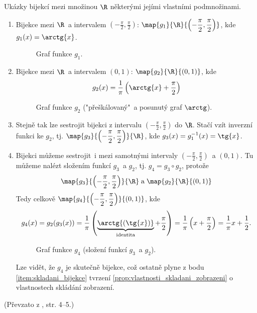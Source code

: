 \begin{example}\label{ex:bijekce_realna_cisla}
    Ukázky bijekcí mezi množinou $\R$ některými jejími vlastními podmnožinami.
    \begin{enumerate}[label=(\roman*)]
        \item\label{item:funkce_arctg} Bijekce mezi $\R$~a intervalem $\displaystyle\left(-\frac{\pi}{2},\frac{\pi}{2}\right)$: $\displaystyle\map{g_1}{\R}{\left(-\frac{\pi}{2},\frac{\pi}{2}\right)}$, kde $g_1(x)=\arctg{x}$.
        \begin{figure}[H]
            \centering
            
            \caption{Graf funkce $g_1$.}
            \label{fig:graf_g1}
        \end{figure}
        \item\label{item:bijekce_0_a_1} Bijekce mezi $\R$~a intervalem $(0,1)$: $\map{g_2}{\R}{(0,1)}$, kde
        \begin{equation*}
            g_2(x)=\frac{1}{\pi}\left(\arctg{x}+\frac{\pi}{2}\right)
        \end{equation*}
        \begin{figure}[H]
            \centering
            
            \caption{Graf funkce $g_2$ ("přeškálovaný"~a posunutý graf $\arctg$).}
            \label{fig:graf_g2}
        \end{figure}
        \item\label{item:funkce_tg} Stejně tak lze sestrojit bijekci z intervalu $\displaystyle\left(-\frac{\pi}{2},\frac{\pi}{2}\right)$ do $\R$. Stačí vzít inverzní funkci ke $g_2$, tj. $\displaystyle\map{g_3}{\left(-\frac{\pi}{2},\frac{\pi}{2}\right)}{\R}$, kde $g_3(x)=g_1^{-1}(x)=\tg{x}$.
        \item\label{item:bijekce_slozena} Bijekci můžeme sestrojit~i mezi samotnými intervaly $\displaystyle\left(-\frac{\pi}{2},\frac{\pi}{2}\right)$~a $(0,1)$. Tu můžeme nalézt složením funkcí $g_3$~a $g_2$, tj. $g_4=g_3\circ g_2$, protože
        \begin{equation*}
            \map{g_3}{\left(-\frac{\pi}{2},\frac{\pi}{2}\right)}{\R}\;\text{a}\;\map{g_2}{\R}{(0,1)}
        \end{equation*}
        Tedy celkově $\displaystyle\map{g_4}{\left(-\frac{\pi}{2},\frac{\pi}{2}\right)}{(0,1)}$, kde
        \begin{equation*}
            g_4(x)=g_2(g_3(x))=\frac{1}{\pi}\left(\underbrace{\arctg{(\tg{x})}}_{\text{identita}}+\frac{\pi}{2}\right)=\frac{1}{\pi}\left(x+\frac{\pi}{2}\right)=\frac{1}{\pi}x+\frac{1}{2}.
        \end{equation*}
        \begin{figure}[H]
            \centering
            
            \caption{Graf funkce $g_4$ (složení funkcí $g_3$~a $g_2$).}
            \label{fig:graf_g4}
        \end{figure}
        Lze vidět, že $g_4$ je skutečně bijekce, což ostatně plyne z bodu \ref{item:skladani_bijekce} tvrzení \ref{prop:vlastnosti_skladani_zobrazeni} o vlastnostech skládání zobrazení.
    \end{enumerate}
\end{example}
(Převzato z \cite{Rmoutil2022}, str. 4--5.)